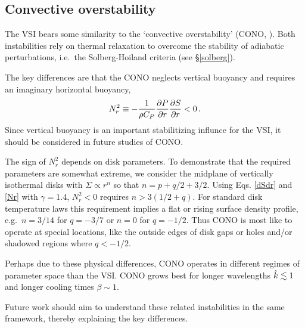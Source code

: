 \subsection{Convective overstability}
The VSI bears some similarity to the `convective overstability'
 (CONO, \citealp{klahr14, lyra14}).   Both instabilities rely on thermal relaxation to 
overcome the stability of adiabatic perturbations, i.e.\ the Solberg-Hoiland
criteria (see \S\ref{solberg}).

The key differences are that the CONO neglects vertical buoyancy
and requires an imaginary horizontal buoyancy,
\begin{align}\label{Nr}
N_r^2 \equiv -{1 \over \rho C_P}{\partial P \over \partial r} {\partial S \over \partial r} < 0\, .
\end{align}
Since vertical buoyancy is an important stabilitizing influnce for the VSI, it should
be considered in future studies of CONO.

The sign of $N_r^2$ depends on disk parameters.  To demonstrate that the required parameters 
are somewhat extreme, we consider the midplane of vertically isothermal disks with 
$\Sigma \propto r^n$ so that $n = p+q/2 + 3/2$. Using Eqs. \ref{dSdr} and \ref{Nr} with $\gamma = 1.4$,
$N_r^2 < 0$ requires $n> 3(1/2 + q)$.  For standard disk temperature laws this requirement implies
a flat or rising surface density profile, e.g.\ $n = 3/14$ for $q = -3/7$ or $n = 0$ for $q = -1/2$.
Thus CONO is most like to operate at special locations, like the outside edges of 
disk gaps or holes and/or shadowed regions where $q < -1/2$.

Perhaps due to these physical differences, CONO operates in different regimes of parameter
space than the VSI.  CONO grows best for longer wavelengths $\hat{k} \lesssim 1$ and longer 
cooling times $\beta \sim 1$. 

Future work should aim to understand these related instabilities in the same framework, thereby 
explaining the key differences.




